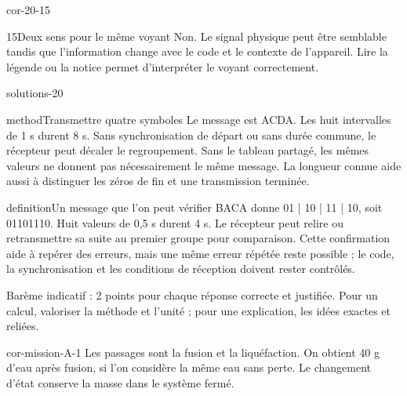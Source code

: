 \documentclass[12pt,twoside,openany]{book}
\begin{document}
\begin{blocLivre}{cor-20-15}
\begin{corrige}{15}{Deux sens pour le même voyant}
Non. Le signal physique peut être semblable tandis que l’information change avec le code et le contexte de l’appareil. Lire la légende ou la notice permet d’interpréter le voyant correctement.\par
\end{corrige}\end{blocLivre}
\label{solutions-20}
\begin{pcFiche}{solutions-20}
\begin{pcEncadre}{method}{Transmettre quatre symboles}
Le message est ACDA. Les huit intervalles de 1 s durent 8 s. Sans synchronisation de départ ou sans durée commune, le récepteur peut décaler le regroupement. Sans le tableau partagé, les mêmes valeurs ne donnent pas nécessairement le même message. La longueur connue aide aussi à distinguer les zéros de fin et une transmission terminée.\par
\end{pcEncadre}
\label{defi-cor-20}
\begin{pcEncadre}{definition}{Un message que l’on peut vérifier}
BACA donne 01 | 10 | 11 | 10, soit 01101110. Huit valeurs de 0,5 s durent 4 s. Le récepteur peut relire ou retransmettre sa suite au premier groupe pour comparaison. Cette confirmation aide à repérer des erreurs, mais une même erreur répétée reste possible ; le code, la synchronisation et les conditions de réception doivent rester contrôlés.\par
\end{pcEncadre}
\end{pcFiche}
\clearpage\gdef\otChapNum{0}\pagestyle{otFront}
\label{cor-bilan-A}
Barème indicatif : 2 points pour chaque réponse correcte et justifiée. Pour un calcul, valoriser la méthode et l’unité ; pour une explication, les idées exactes et reliées.\par
\begin{blocLivre}{cor-mission-A-1}
Les passages sont la fusion et la liquéfaction. On obtient 40 g d’eau après fusion, si l’on considère la même eau sans perte. Le changement d’état conserve la masse dans le système fermé.\par
{}
\end{blocLivre}
\end{document}

